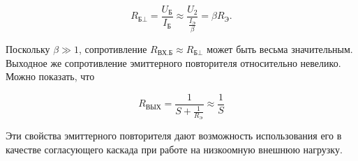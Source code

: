 $$R_{\text{Б} \bot}=\frac{U_{\text{Б}}}{I_{\text{Б}}} \approx \frac{U_2}{ \frac{ I_{ \text{Э} } }{\beta}}=\beta R_{\text{Э}}.$$

Поскольку $\beta \gg 1$, сопротивление  $R_{\text{ВХ.Б}} \approx R_{\text{Б} \bot}$ может быть весьма значительным. Выходное же сопротивление эмиттерного повторителя относительно невелико. Можно показать, что

$$R_{\text{ВЫХ}}=\frac{1}{S+\frac{1}{R_{\text{Э}}}} \approx \frac{1}{S}$$

Эти свойства эмиттерного повторителя дают возможность использования его в качестве согласующего каскада при работе на низкоомную внешнюю нагрузку.









